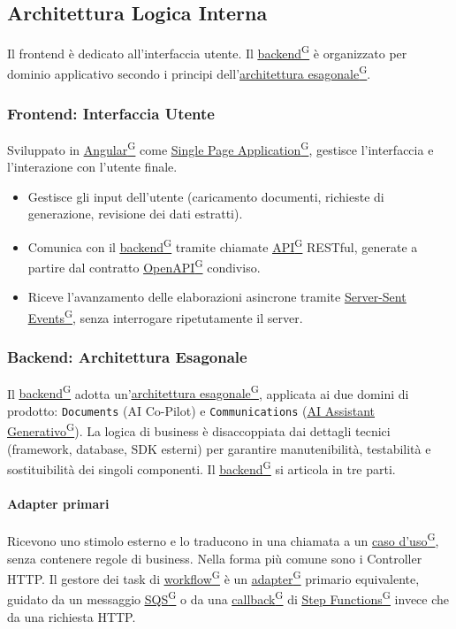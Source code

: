 \documentclass[a4paper,12pt]{article}
\providecommand{\glslink}[2]{\href{https://alittlebyte-19.github.io/Documentazione/glossario.html\#gls-#1}{\underline{#2}\textsuperscript{\scriptsize G}}}
\begin{document}
\subsection{Architettura Logica Interna}

Il frontend è dedicato all'interfaccia utente. Il \glslink{backend}{backend} è organizzato per dominio applicativo secondo i principi dell'\glslink{architettura-esagonale}{architettura esagonale}.

\subsubsection{Frontend: Interfaccia Utente}

Sviluppato in \glslink{angular}{Angular} come \glslink{spa-single-page-application}{Single Page Application}, gestisce l'interfaccia e l'interazione con l'utente finale.

\begin{itemize}
    \item Gestisce gli input dell'utente (caricamento documenti, richieste di generazione, revisione dei dati estratti).
    \item Comunica con il \glslink{backend}{backend} tramite chiamate \glslink{api-application-programming-interface}{API} RESTful, generate a partire dal contratto \glslink{openapi}{OpenAPI} condiviso.
    \item Riceve l'avanzamento delle elaborazioni asincrone tramite \glslink{sse-server-sent-events}{Server-Sent Events}, senza interrogare ripetutamente il server.
\end{itemize}

\subsubsection{Backend: Architettura Esagonale}

Il \glslink{backend}{backend} adotta un'\glslink{architettura-esagonale}{architettura esagonale}, applicata ai due domini di prodotto: \texttt{Documents} (AI Co-Pilot) e \texttt{Communications} (\glslink{ai-assistant-generativo-ai-assistant}{AI Assistant Generativo}). La logica di business è disaccoppiata dai dettagli tecnici (framework, database, SDK esterni) per garantire manutenibilità, testabilità e sostituibilità dei singoli componenti. Il \glslink{backend}{backend} si articola in tre parti.

\paragraph{Adapter primari}
Ricevono uno stimolo esterno e lo traducono in una chiamata a un \glslink{caso-d-uso-uc}{caso d'uso}, senza contenere regole di business. Nella forma più comune sono i Controller HTTP. Il gestore dei task di \glslink{workflow}{workflow} è un \glslink{adapter}{adapter} primario equivalente, guidato da un messaggio \glslink{sqs-simple-queue-service}{SQS} o da una \glslink{callback}{callback} di \glslink{step-functions}{Step Functions} invece che da una richiesta HTTP.
\end{document}
